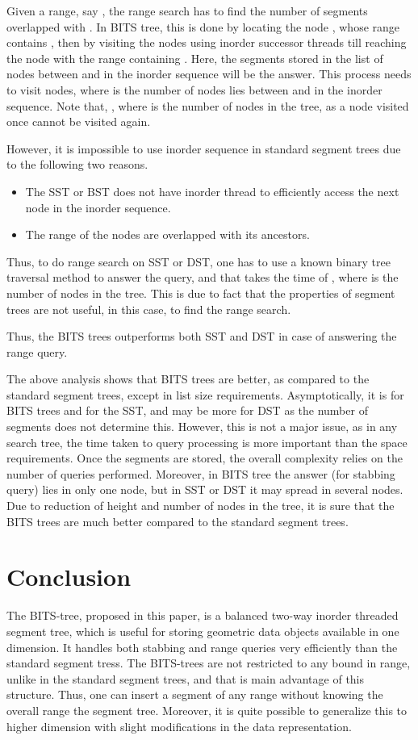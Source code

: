 \documentclass{article}
\newenvironment{proof}{{\bf Proof:}}{\hfill {\fbox{}}}
\begin{document}
\begin{proof}
Given a range, say , the range search has to find the number of segments overlapped with . In BITS tree, this is done by locating the node , whose range contains , then by visiting the nodes using inorder successor threads till reaching the node  with the range containing . Here, the segments stored in the list of nodes between  and  in the inorder sequence will be the answer. This process needs to visit  nodes, where  is the number of nodes lies between  and  in the inorder sequence. Note that, , where  is the number of nodes in the tree, as a node visited once cannot be visited again. 
\par
However, it is impossible to use inorder sequence in standard segment trees due to the following two reasons.
\begin{itemize}
	\item The SST or BST does not have inorder thread to efficiently access the next node in the inorder sequence.
	\item The range of the nodes are overlapped with its ancestors.
\end{itemize}
Thus, to do range search on SST or DST, one has to use a known binary tree traversal method to answer the query, and that takes the time of , where  is the number of nodes in the tree. This is due to fact that the properties of segment trees are not useful, in this case, to find the range search. 
\par
Thus, the BITS trees outperforms both SST and DST in case of answering the range query.
\end{proof}
\par
The above analysis shows that BITS trees are better, as compared to the standard segment trees, except in list size requirements. Asymptotically, it is  for BITS trees and  for the SST, and may be more for DST as the number of segments does not determine this. However, this is not a major issue, as in any search tree, the time taken to query processing is more important than the space requirements. Once the segments are stored, the overall complexity relies on the number of queries performed. Moreover, in BITS tree the answer (for stabbing query) lies in only one node, but in SST or DST it may spread in several nodes. Due to reduction of height and number of nodes in the tree, it is sure that the BITS trees are much better compared to the standard segment trees. 
\section{Conclusion}
The BITS-tree, proposed in this paper, is a balanced two-way inorder threaded segment tree, which is useful for storing geometric data objects available in one dimension. It handles both stabbing and range queries very efficiently than the standard segment tress. The BITS-trees are not restricted to any bound in range, unlike in the standard segment trees, and that is main advantage of this structure. Thus, one can insert a segment of any range without knowing the overall range the segment tree. Moreover, it is quite possible to generalize this to higher dimension with slight modifications in the data representation.


\end{document}
